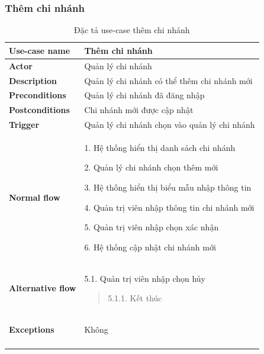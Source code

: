 \subsubsection{Thêm chi nhánh}
{
    \setlength\extrarowheight{6pt}
    \begin{longtable}{| p{} | p{} |}
        \hline
        \textbf{Use-case name}
         &
        Thêm chi nhánh
        \\
        \hline
        \textbf{Actor}
         &
        Quản lý chi nhánh
        \\
        \hline
        \textbf{Description}
         &
        Quản lý chi nhánh có thể thêm chi nhánh mới
        \\
        \hline
        \textbf{Preconditions}
         &
        Quản lý chi nhánh đã đăng nhập
        \\
        \hline
        \textbf{Postconditions}
         &
        Chi nhánh mới được cập nhật
        \\
        \hline
        \textbf{Trigger}
         &
        Quản lý chi nhánh chọn vào quản lý chi nhánh
        \\
        \hline
        \begin{flushleft}
            \textbf{Normal flow}
        \end{flushleft}
         &
        1. Hệ thống hiển thị danh sách chi nhánh

        2. Quản lý chi nhánh chọn thêm mới

        3. Hệ thống hiển thị biểu mẫu nhập thông tin

        4. Quản trị viên nhập thông tin chi nhánh mới

        5. Quản trị viên nhập chọn xác nhận

        6. Hệ thống cập nhật chi nhánh mới
        \\
        \hline
        \begin{flushleft}
            \textbf{Alternative flow}
        \end{flushleft}
         &
        5.1. Quản trị viên nhập chọn hủy
        \begin{quote}
            5.1.1. Kết thúc
        \end{quote}
        \\
        \hline
        \begin{flushleft}
            \textbf{Exceptions}
        \end{flushleft}
         &
        Không
        \\
        \hline
        \caption{Đặc tả use-case thêm chi nhánh}
    \end{longtable}
}
